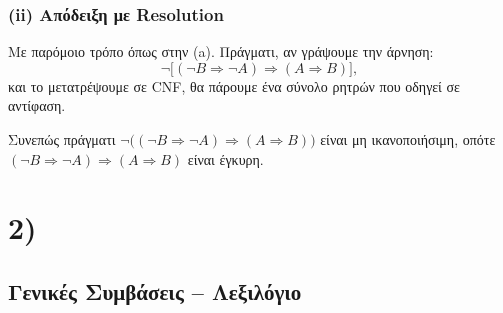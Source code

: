 \documentclass[a4paper,12pt]{article}
\begin{document}
\subsubsection*{(ii) Απόδειξη με Resolution}

Με παρόμοιο τρόπο όπως στην (a). Πράγματι, αν γράψουμε την άρνηση:
\[
\neg \bigl[(\neg B \Rightarrow \neg A) \Rightarrow (A \Rightarrow B)\bigr],
\]
και το μετατρέψουμε σε CNF, θα πάρουμε ένα σύνολο ρητρών που οδηγεί σε αντίφαση.

Συνεπώς πράγματι \(\neg \bigl((\neg B \Rightarrow \neg A) \Rightarrow (A \Rightarrow B)\bigr)\) είναι μη ικανοποιήσιμη, οπότε \((\neg B \Rightarrow \neg A) \Rightarrow (A \Rightarrow B)\) είναι έγκυρη.

\section*{2)}

\subsection*{Γενικές Συμβάσεις – Λεξιλόγιο}
\end{document}
